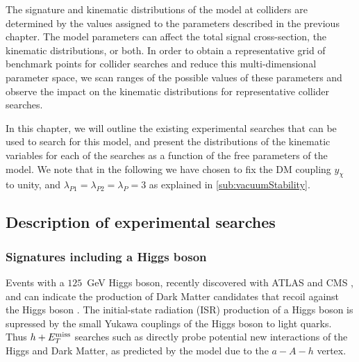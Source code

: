 The signature and kinematic distributions of the \hdma model at colliders are determined by the values assigned to the parameters described in the previous chapter. 
The model parameters can affect the total signal cross-section, the kinematic distributions, or both. 
In order to obtain a representative grid of benchmark points for collider searches and reduce this multi-dimensional parameter space, we scan ranges of the possible values of these parameters and observe the impact on the kinematic distributions for representative collider searches.


In this chapter, we will outline the existing experimental searches that can be used to search for this model, and present the distributions of the kinematic variables for each of the searches as a function of the free parameters of the model. 
We note that in the following we have chosen to fix the DM coupling  $y_\chi$ to unity, and $\lambda_{P1} = \lambda_{P2} = \lambda_P = 3$ as explained in \autoref{sub:vacuumStability}.  

\subsection{Description of experimental searches}

\subsubsection{Signatures including a Higgs boson}

Events with a  $125$~GeV Higgs boson, recently discovered with ATLAS and CMS \cite{Aad:2012tfa,Chatrchyan:2012xdj}, and \MET can indicate 
the production of Dark Matter candidates that recoil against the Higgs boson \cite{Carpenter:2013xra,Petrov:2013nia}. 
The initial-state radiation (ISR) production of a Higgs boson is supressed by the small Yukawa couplings of the Higgs boson to light quarks. Thus $h+E_T^\mathrm{miss}$ searches such as \cite{Aaboud:2017yqz,Aaboud:2017uak} 
directly probe potential new interactions of the Higgs and Dark Matter, as predicted by the \hdma model \cite{Bauer:2017ota,No:2015xqa} due to the $a-A-h$ vertex. 

 
